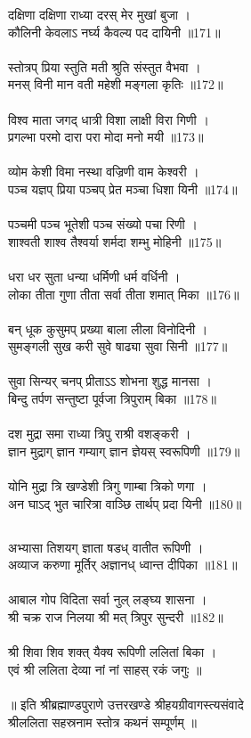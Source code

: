 दक्षिणा दक्षिणा राध्या दरस् मेर मुखां बुजा ।\\
कौलिनी केवलाऽ नर्घ्य कैवल्य पद दायिनी ॥171॥\\
\\
स्तोत्रप् प्रिया स्तुति मती श्रुति संस्तुत वैभवा ।\\
मनस् विनी मान वती महेशी मङ्गला कृतिः ॥172॥\\
\\
विश्व माता जगद् धात्री विशा लाक्षी विरा गिणी ।\\
प्रगल्भा परमो दारा परा मोदा मनो मयी ॥173॥\\
\\
व्योम केशी विमा नस्था वज्रिणी वाम केश्वरी ।\\
पञ्च यज्ञप् प्रिया पञ्चप् प्रेत मञ्चा धिशा यिनी ॥174॥\\
\\
पञ्चमी पञ्च भूतेशी पञ्च संख्यो पचा रिणी ।\\
शाश्वती शाश्व तैश्वर्या शर्मदा शम्भु मोहिनी ॥175॥\\
\\
धरा धर सुता धन्या धर्मिणी धर्म वर्धिनी ।\\
लोका तीता गुणा तीता सर्वा तीता शमात् मिका ॥176॥\\
\\
बन् धूक कुसुमप् प्रख्या बाला लीला विनोदिनी ।\\
सुमङ्गली सुख करी सुवे षाढ्या सुवा सिनी ॥177॥\\
\\
सुवा सिन्यर् चनप् प्रीताऽऽ शोभना शुद्ध मानसा ।\\
बिन्दु तर्पण सन्तुष्टा पूर्वजा त्रिपुराम् बिका ॥178॥\\
\\
दश मुद्रा समा राध्या त्रिपु राश्री वशङ्करी ।\\
ज्ञान मुद्राग् ज्ञान गम्याग् ज्ञान ज्ञेयस् स्वरूपिणी ॥179॥\\
\\
योनि मुद्रा त्रि खण्डेशी त्रिगु णाम्बा त्रिको णगा ।\\
अन घाऽद् भुत चारित्रा वाञ्छि तार्थप् प्रदा यिनी ॥180॥\\
\subsection{}
अभ्यासा तिशयग् ज्ञाता षडध् वातीत रूपिणी ।\\
अव्याज करुणा मूर्तिर् अज्ञानध् ध्वान्त दीपिका ॥181॥\\
\\
आबाल गोप विदिता सर्वा नुल् लङ्घ्य शासना ।\\
श्री चक्र राज निलया श्री मत् त्रिपुर सुन्दरी ॥182॥\\
\\
श्री शिवा शिव शक्त् यैक्य रूपिणी ललितां बिका ।\\
एवं श्री ललिता देव्या नां नां साहस् रकं जगुः ॥\\
\\
॥ इति श्रीब्रह्माण्डपुराणे उत्तरखण्डे श्रीहयग्रीवागस्त्यसंवादे\\
श्रीललिता सहस्रनाम स्तोत्र कथनं सम्पूर्णम् ॥\\
